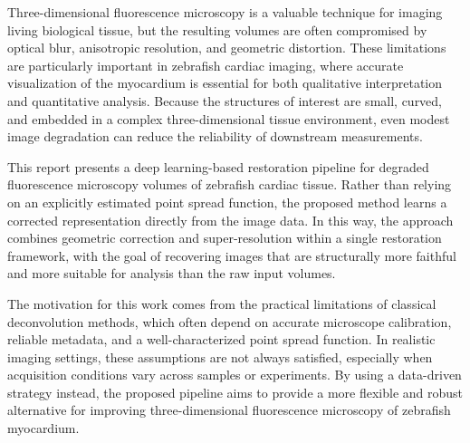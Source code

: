 Three-dimensional fluorescence microscopy is a valuable technique for imaging living biological tissue, but the resulting volumes are often compromised by optical blur, anisotropic resolution, and geometric distortion. These limitations are particularly important in zebrafish cardiac imaging, where accurate visualization of the myocardium is essential for both qualitative interpretation and quantitative analysis. Because the structures of interest are small, curved, and embedded in a complex three-dimensional tissue environment, even modest image degradation can reduce the reliability of downstream measurements.

This report presents a deep learning-based restoration pipeline for degraded fluorescence microscopy volumes of zebrafish cardiac tissue. Rather than relying on an explicitly estimated point spread function, the proposed method learns a corrected representation directly from the image data. In this way, the approach combines geometric correction and super-resolution within a single restoration framework, with the goal of recovering images that are structurally more faithful and more suitable for analysis than the raw input volumes.

The motivation for this work comes from the practical limitations of classical deconvolution methods, which often depend on accurate microscope calibration, reliable metadata, and a well-characterized point spread function. In realistic imaging settings, these assumptions are not always satisfied, especially when acquisition conditions vary across samples or experiments. By using a data-driven strategy instead, the proposed pipeline aims to provide a more flexible and robust alternative for improving three-dimensional fluorescence microscopy of zebrafish myocardium.

